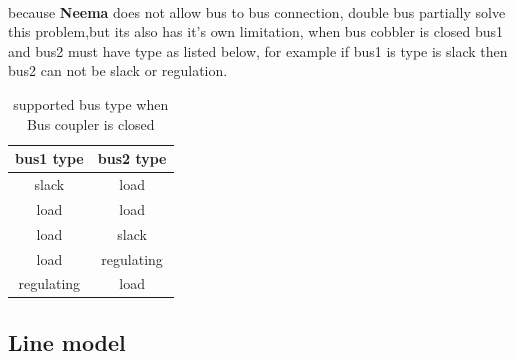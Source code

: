 \documentclass{article}
\begin{document}
\paragraph{} because \textbf{Neema} does not allow bus to bus connection, double bus partially solve this problem,but its also has it's own limitation, when bus cobbler is closed bus1 and bus2 must have type as listed below, for example if bus1 is type is slack then bus2 can not be slack or regulation.
\begin{table}[h!]
	\begin{center}
		\caption{supported bus type when Bus coupler is closed}
		\label{tab:table1}
		\begin{tabular}{c|c} %
			\textbf{bus1 type} & \textbf{bus2 type}\\
			\hline
			slack & load \\
			load & load \\
			load & slack \\
			load & regulating \\
			regulating & load \\
		\end{tabular}
	\end{center}
\end{table}
\subsection{Line model}
\end{document}
